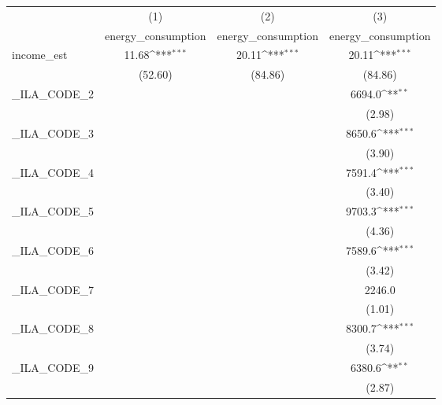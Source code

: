 {
\def\sym#1{\ifmmode^{#1}\else\(^{#1}\)\fi}
\begin{tabular}{l*{3}{c}}
\hline\hline
            &\multicolumn{1}{c}{(1)}&\multicolumn{1}{c}{(2)}&\multicolumn{1}{c}{(3)}\\
            &\multicolumn{1}{c}{energy\_consumption}&\multicolumn{1}{c}{energy\_consumption}&\multicolumn{1}{c}{energy\_consumption}\\
\hline
income\_est  &       11.68\sym{***}&       20.11\sym{***}&       20.11\sym{***}\\
            &     (52.60)         &     (84.86)         &     (84.86)         \\
[1em]
\_ILA\_CODE\_2 &                     &                     &      6694.0\sym{**} \\
            &                     &                     &      (2.98)         \\
[1em]
\_ILA\_CODE\_3 &                     &                     &      8650.6\sym{***}\\
            &                     &                     &      (3.90)         \\
[1em]
\_ILA\_CODE\_4 &                     &                     &      7591.4\sym{***}\\
            &                     &                     &      (3.40)         \\
[1em]
\_ILA\_CODE\_5 &                     &                     &      9703.3\sym{***}\\
            &                     &                     &      (4.36)         \\
[1em]
\_ILA\_CODE\_6 &                     &                     &      7589.6\sym{***}\\
            &                     &                     &      (3.42)         \\
[1em]
\_ILA\_CODE\_7 &                     &                     &      2246.0         \\
            &                     &                     &      (1.01)         \\
[1em]
\_ILA\_CODE\_8 &                     &                     &      8300.7\sym{***}\\
            &                     &                     &      (3.74)         \\
[1em]
\_ILA\_CODE\_9 &                     &                     &      6380.6\sym{**} \\
            &                     &                     &      (2.87)         \\

\end{tabular}}
